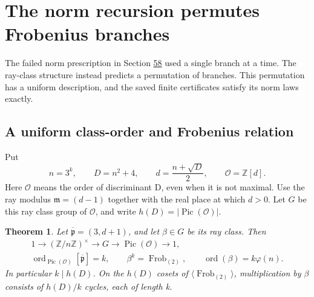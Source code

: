 \documentclass[11pt,reqno]{amsart}
\theoremstyle{plain}
\newtheorem{theorem}{Theorem}[section]
\begin{document}
\section{The norm recursion permutes Frobenius branches}\label{sec:63}

The failed norm prescription in Section \hyperref[sec:58]{58} used a single branch at a
time. The ray-class structure instead predicts a permutation of
branches. This permutation has a uniform description, and the saved
finite certificates satisfy its norm laws exactly.

\subsection{A uniform class-order and Frobenius relation}\label{sec:63.1}

Put
\[
 n=3^k,\qquad D=n^2+4,\qquad d=\frac{n+\sqrt D}{2},
 \qquad\mathcal O=\mathbb Z[d].
\]
Here \(\mathcal O\) means the order of discriminant D, even when it
is not maximal. Use the ray modulus
\(\mathfrak m=(d-1)\) together with the real place at which \(d>0\).
Let \(G\) be this ray class group of \(\mathcal O\), and write
\(h(D)=|\operatorname{Pic}(\mathcal O)|\).

\begin{theorem}
Let \(\overline{\mathfrak p}=(3,d+1)\), and let
\(\beta\in G\) be its ray class. Then
\begin{equation*}
 \begin{gathered}
 1\longrightarrow(\mathbb Z/n\mathbb Z)^\times
 \longrightarrow G\longrightarrow\operatorname{Pic}(\mathcal O)
 \longrightarrow1,\\
 \operatorname{ord}_{\operatorname{Pic}(\mathcal O)}
     [\overline{\mathfrak p}]=k,\qquad
 \beta^k=\operatorname{Frob}_{(2)},\qquad
 \operatorname{ord}(\beta)=k\varphi(n).
 \tag{63.1}
 \end{gathered}
\end{equation*}
In particular \(k\mid h(D)\). On the \(h(D)\) cosets of
\(\langle\operatorname{Frob}_{(2)}\rangle\), multiplication by
\(\beta\) consists of \(h(D)/k\) cycles, each of length k.
\end{theorem}
\end{document}
